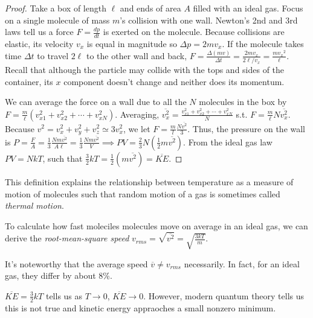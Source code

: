 \begin{proof}
    Take a box of length $\ell$ and ends of area $A$ filled with an ideal gas. Focus on a single molecule of mass $m$'s collision with one wall. Newton's 2nd and 3rd laws tell us a force $F = \frac{dp}{dt}$ is exerted on the molecule. Because collisions are elastic, its velocity $v_x$ is equal in magnitude so $\Delta p = 2mv_x$. If the molecule takes time $\Delta t$ to travel $2\ell$ to the other wall and back, $F = \frac{\Delta (mv)}{\Delta t} = \frac{2mv_x}{2\ell/v_x} = \frac{m{v_x}^2}{\ell}$. Recall that although the particle may collide with the tops and sides of the container, its $x$ component doesn't change and neither does its momentum.

    We can average the force on a wall due to all the $N$ molecules in the box by $F = \frac{m}{\ell} (v_{x1}^2 + v_{x2}^2 + \cdots + v_{xN}^2)$. Averaging, $\overline{v_x^2} = \frac{v_{x1}^2 + v_{x2}^2 + \cdots + v_{xN}^2}{N}$ s.t. $F = \frac{m}{\ell} N \overline{v_x^2}$. Because $v^2 = v_x^2 + v_y^2 + v_z^2 \simeq 3v_x^2$, we let $F = \frac{m}{l}\frac{N\overline{v^2}}{3}$. Thus, the pressure on the wall is $P = \frac{F}{A} = \frac{1}{3} \frac{Nm\overline{v^2}}{A\ell} = \frac{1}{3}\frac{Nm\overline{v^2}}{V} \implies PV = \frac{2}{3}N(\frac{1}{2}m\overline{v^2})$. From the ideal gas law $PV = NkT$, such that $\frac{3}{2}kT = \frac{1}{2}(m\overline{v^2}) = \overline{KE}$. 
\end{proof}
\begin{definition}
    This definition explains the relationship between temperature as a measure of motion of molecules such that random motion of a gas is sometimes called \emph{thermal motion}.
\end{definition}
\begin{definition}
    To calculate how fast moleciles molecules move on average in an ideal gas, we can derive the \emph{root-mean-square speed} $v_{rms} = \sqrt{\overline{v^2}} = \sqrt{\frac{3kT}{m}}$.
\end{definition}
\begin{remark}
    It's noteworthy that the average speed $\overline{v} \neq v_{rms}$ necessarily. In fact, for an ideal gas, they differ by about 8\%.
\end{remark}
\begin{note}
    $\overline{KE} = \frac{3}{2} kT$ tells us as $T \to 0$, $\overline{KE} \to 0$. However, modern quantum theory tells us this is not true and kinetic energy appraoches a small nonzero minimum.
\end{note}

